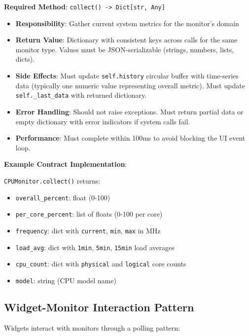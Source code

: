 \documentclass[12pt,a4paper,oneside]{report}
\begin{document}
\textbf{Required Method}: \texttt{collect() -> Dict[str, Any]}

\begin{itemize}
    \item \textbf{Responsibility}: Gather current system metrics for the monitor's domain
    \item \textbf{Return Value}: Dictionary with consistent keys across calls for the same monitor type. Values must be JSON-serializable (strings, numbers, lists, dicts).
    \item \textbf{Side Effects}: Must update \texttt{self.history} circular buffer with time-series data (typically one numeric value representing overall metric). Must update \texttt{self.\_last\_data} with returned dictionary.
    \item \textbf{Error Handling}: Should not raise exceptions. Must return partial data or empty dictionary with error indicators if system calls fail.
    \item \textbf{Performance}: Must complete within 100ms to avoid blocking the UI event loop.
\end{itemize}

\textbf{Example Contract Implementation}:

\texttt{CPUMonitor.collect()} returns:
\begin{itemize}
    \item \texttt{overall\_percent}: float (0-100)
    \item \texttt{per\_core\_percent}: list of floats (0-100 per core)
    \item \texttt{frequency}: dict with \texttt{current}, \texttt{min}, \texttt{max} in MHz
    \item \texttt{load\_avg}: dict with \texttt{1min}, \texttt{5min}, \texttt{15min} load averages
    \item \texttt{cpu\_count}: dict with \texttt{physical} and \texttt{logical} core counts
    \item \texttt{model}: string (CPU model name)
\end{itemize}

\subsection{Widget-Monitor Interaction Pattern}

Widgets interact with monitors through a polling pattern:
\end{document}
